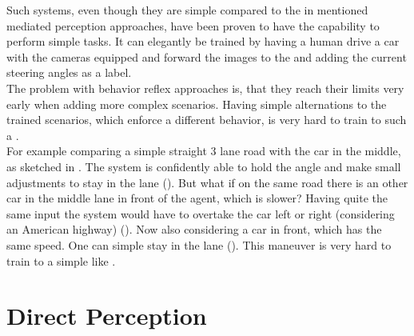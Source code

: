 Such systems, even though they are simple compared to the in  mentioned mediated perception approaches, have been proven to have the capability to perform simple tasks. It can elegantly be trained by having a human drive a car with the cameras equipped and forward the images to the \nn and adding the current steering angles as a label.\cite{chen2015deepdriving}\\

The problem with behavior reflex approaches is, that they reach their limits very early when adding more complex scenarios. Having simple alternations to the trained scenarios, which enforce a different behavior, is very hard to train to such a \nn.\\
For example comparing a simple straight 3 lane road with the car in the middle, as sketched in . The system is confidently able to hold the angle and make small adjustments to stay in the lane (). But what if on the same road there is an other car in the middle lane in front of the agent, which is slower? Having quite the same input the system would have to overtake the car left or right (considering an American highway) (). Now also considering a car in front, which has the same speed. One can simple stay in the lane (). This maneuver is very hard to train to a simple \nn like \alvinn.





\section{Direct Perception}\label{sec: Direct Perception}


